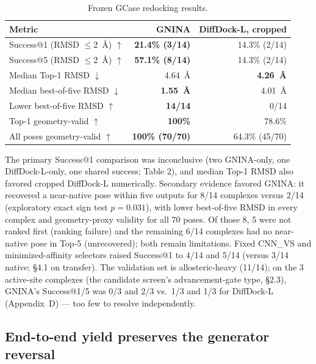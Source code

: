 \documentclass{article}
\begin{document}
\begin{table}[t]
  \caption{Frozen GCase redocking results.}
  \label{tab:redocking}
  \centering
  \footnotesize
  \begin{tabular}{lrr}
    \toprule
    Metric & GNINA & DiffDock-L, cropped \\
    \midrule
    Success@1 (RMSD $\leq$2~\AA) $\uparrow$ & \textbf{21.4\% (3/14)} & 14.3\% (2/14) \\
    Success@5 (RMSD $\leq$2~\AA) $\uparrow$ & \textbf{57.1\% (8/14)} & 14.3\% (2/14) \\
    Median Top-1 RMSD $\downarrow$ & 4.64~\AA & \textbf{4.26~\AA} \\
    Median best-of-five RMSD $\downarrow$ & \textbf{1.55~\AA} & 4.01~\AA \\
    Lower best-of-five RMSD $\uparrow$ & \textbf{14/14} & 0/14 \\
    Top-1 geometry-valid $\uparrow$ & \textbf{100\%} & 78.6\% \\
    All poses geometry-valid $\uparrow$ & \textbf{100\% (70/70)} & 64.3\% (45/70) \\
    \bottomrule
  \end{tabular}
\end{table}

The primary Success@1 comparison was inconclusive (two GNINA-only, one DiffDock-L-only, one shared success; Table 2), and median Top-1 RMSD also favored cropped DiffDock-L numerically. Secondary evidence favored GNINA: it recovered a near-native pose within five outputs for 8/14 complexes versus 2/14 (exploratory exact sign test $p=0.031$), with lower best-of-five RMSD in every complex and geometry-proxy validity for all 70 poses. Of those 8, 5 were not ranked first (ranking failure) and the remaining 6/14 complexes had no near-native pose in Top-5 (unrecovered); both remain limitations. Fixed CNN\_VS and minimized-affinity selectors raised Success@1 to 4/14 and 5/14 (versus 3/14 native; \S4.1 on transfer). The validation set is allosteric-heavy (11/14); on the 3 active-site complexes (the candidate screen's advancement-gate type, \S2.3), GNINA's Success@1/5 was 0/3 and 2/3 vs.\ 1/3 and 1/3 for DiffDock-L (Appendix~D) --- too few to resolve independently.

\subsection{End-to-end yield preserves the generator reversal}
\end{document}
